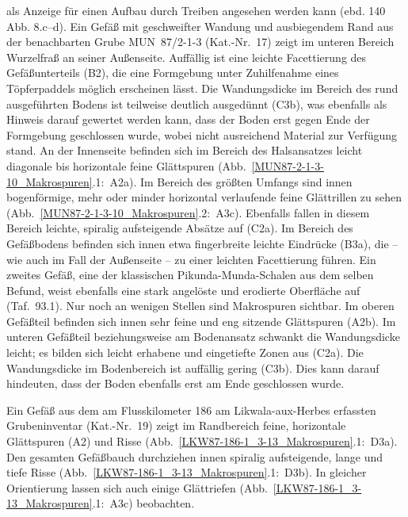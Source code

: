 \begin{multicols}{2}
als Anzeige für einen Aufbau durch Treiben angesehen werden kann (ebd. 140 Abb. 8.c--d). Ein Gefäß mit geschweifter Wandung und ausbiegendem Rand aus der benachbarten Grube MUN~87/2-1-3 (Kat.-Nr.~17) zeigt im unteren Bereich Wurzelfraß an seiner Außenseite. Auffällig ist eine leichte Facettierung des Gefäßunterteils (B2), die eine Formgebung unter Zuhilfenahme eines Töpferpaddels möglich erscheinen lässt. Die Wandungsdicke im Bereich des rund ausgeführten Bodens ist teilweise deutlich ausgedünnt (C3b), was ebenfalls als Hinweis darauf gewertet werden kann, dass der Boden erst gegen Ende der Formgebung geschlossen wurde, wobei nicht ausreichend Material zur Verfügung stand. An der Innenseite befinden sich im Bereich des Halsansatzes leicht diagonale bis horizontale feine Glättspuren (Abb.~\ref{MUN87-2-1-3-10_Makrospuren}.1:~A2a). Im Bereich des größten Umfangs sind innen bogenförmige, mehr oder minder horizontal verlaufende feine Glättrillen zu sehen (Abb.~\ref{MUN87-2-1-3-10_Makrospuren}.2:~A3c). Ebenfalls fallen in diesem Bereich leichte, spiralig aufsteigende Absätze auf (C2a). Im Bereich des Gefäßbodens befinden sich innen etwa fingerbreite leichte Eindrücke (B3a), die -- wie auch im Fall der Außenseite -- zu einer leichten Facettierung führen. Ein zweites Gefäß, eine der klassischen Pikunda-Munda-Schalen aus dem selben Befund, weist ebenfalls eine stark angelöste und erodierte Oberfläche auf (Taf.~93.1). Nur noch an wenigen Stellen sind Makrospuren sichtbar. Im oberen Gefäßteil befinden sich innen sehr feine und eng sitzende Glättspuren (A2b). Im unteren Gefäßteil beziehungsweise am Bodenansatz schwankt die Wandungsdicke leicht; es bilden sich leicht erhabene und eingetiefte Zonen aus (C2a). Die Wandungsdicke im Bodenbereich ist auffällig gering (C3b). Dies kann darauf hindeuten, dass der Boden ebenfalls erst am Ende geschlossen wurde.

Ein Gefäß aus dem am Flusskilometer 186 am \mbox{Likwala}-\mbox{aux}-\mbox{Herbes} erfassten Grubeninventar (Kat.-Nr.~19) zeigt im Randbereich feine, horizontale Glättspuren (A2) und Risse (Abb.~\ref{LKW87-186-1_3-13_Makrospuren}.1:~D3a). Den gesamten Gefäßbauch durchziehen innen spiralig aufsteigende, lange und tiefe Risse (Abb.~\ref{LKW87-186-1_3-13_Makrospuren}.1:~D3b). In gleicher Orientierung lassen sich auch einige Glättriefen (Abb.~\ref{LKW87-186-1_3-13_Makrospuren}.1:~A3c) beobachten. 


\end{multicols}
